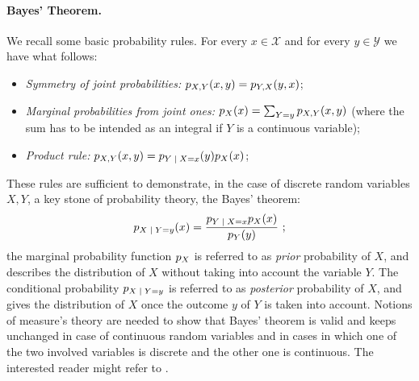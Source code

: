 \paragraph*{Bayes' Theorem.}
We recall some basic probability rules. For every $x\in\mathcal{X}$ and for every $y\in\mathcal{Y}$ we have what follows:
\begin{itemize}
\item \emph{Symmetry of joint probabilities: } $p_{X,Y}(x,y)=p_{Y,X}(y,x)$;
\item \emph{Marginal probabilities from joint ones: } $p_X(x) = \sum_{Y=y}p_{X,Y}(x,y)$ (where the sum has to be intended as an integral if $Y$ is a continuous variable);
\item \emph{Product rule: } $\pdf_{X,Y}(x,y) = \pdf_{\given{Y}{X=x}}(y)\pdf_{X}(x)$;
\end{itemize} 
These rules are sufficient to demonstrate, in the case of discrete random variables $X,Y$, a key stone of probability theory, the Bayes' theorem: 
\begin{equation}
\pdf_{\given{X}{Y=y}}(x) = \frac{\pdf_{\given{Y}{X=x}}\pdf_{X}(x)}{\pdf_{Y}(y)} \mbox{ ;}
\end{equation}
the marginal probability function $p_X$ is referred to as \emph{prior} probability of $X$, and describes the distribution of $X$ without taking into account the variable $Y$. The conditional probability $\pdf_{\given{X}{Y=y}}$ is referred to as \emph{posterior} probability of $X$, and gives the distribution of $X$ once the outcome $y$ of $Y$ is taken into account. Notions of measure's theory are needed to show that Bayes' theorem is valid and keeps unchanged in case of continuous random variables and in cases in which one of the two involved variables is discrete and the other one is continuous. The interested reader might refer to \cite{feller2008introduction}. 

